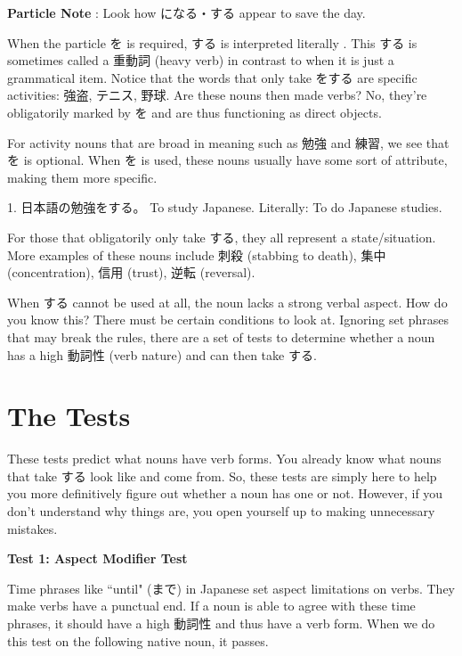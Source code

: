 \par{\textbf{Particle Note }: Look how になる・する appear to save the day. }

\par{When the particle を is required, する is interpreted literally . This する is sometimes called a 重動詞 (heavy verb) in contrast to when it is just a grammatical item. Notice that the words that only take をする are specific activities: 強盗, テニス, 野球. Are these nouns then made verbs? No, they're obligatorily marked by を and are thus functioning as direct objects. }

\par{ For activity nouns that are broad in meaning such as 勉強 and 練習, we see that を is optional. When を is used, these nouns usually have some sort of attribute, making them more specific. }

\par{1. 日本語の勉強をする。 \hfill\break
To study Japanese. \hfill\break
Literally: To do Japanese studies. }

\par{ For those that obligatorily only take する, they all represent a state\slash situation. More examples of these nouns include 刺殺 (stabbing to death), 集中 (concentration), 信用 (trust), 逆転 (reversal). }

\par{ When する cannot be used at all, the noun lacks a strong verbal aspect. How do you know this? There must be certain conditions to look at. Ignoring set phrases that may break the rules, there are a set of tests to determine whether a noun has a high 動詞性 (verb nature) and can then take する. }
      
\section{The Tests}
 
\par{ These tests predict what nouns have verb forms. You already know what nouns that take する look like and come from. So, these tests are simply here to help you more definitively figure out whether a noun has one or not. However, if you don't understand why things are, you open yourself up to making unnecessary mistakes. }

\begin{center}
\textbf{Test 1: Aspect Modifier Test }
\end{center}

\par{ Time phrases like “until" (まで) in Japanese set aspect limitations on verbs. They make verbs have a punctual end. If a noun is able to agree with these time phrases, it should have a high 動詞性 and thus have a verb form. When we do this test on the following native noun, it passes. }

